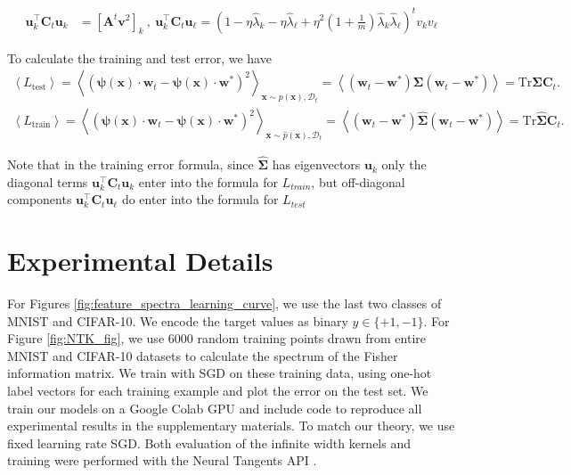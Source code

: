 \documentclass{article} %
\def\x{\bm x}
\def\w{\bm w}
\def\x{\mathbf x}
\def\w{\mathbf w}
\def\A{\mathbf A}
\def\u{\mathbf u}
\def\C{\mathbf C}
\begin{document}
\begin{align}
    \u_k^\top \C_{t} \u_k &= \left[ \A^t \bm v^2 \right]_k \ , \ \u_k^\top \C_{t} \u_\ell = \left(1-\eta\hat{\lambda}_k-\eta \hat{\lambda}_\ell + \eta^2 \left(1 + \frac{1}{m} \right)\hat{\lambda}_k \hat{\lambda}_\ell \right)^t v_k v_\ell
\end{align}

To calculate the training and test error, we have
\begin{align}
    \left< L_{\text{test}} \right>= \left< ( \bm\psi(\x) \cdot \w_t - \bm\psi(\x) \cdot \bm w^* )^2 \right>_{\x \sim p(\x), \mathcal D_t } = \left< (\w_t- \w^*) \bm\Sigma \left( \w_t - \w^* \right) \right> = \text{Tr} \bm\Sigma \C_t. \nonumber
    \\
    \left< L_{\text{train}} \right> = \left< ( \bm\psi(\x) \cdot \w_t - \bm\psi(\x) \cdot \bm w^* )^2 \right>_{\x \sim \hat{p}(\x), \mathcal D_t } = \left< (\w_t- \w^*) \bm{\hat\Sigma} \left( \w_t - \w^* \right) \right> = \text{Tr} \bm{\hat \Sigma} \C_t.
\end{align}

Note that in the training error formula, since $\bm{\hat \Sigma}$ has eigenvectors $\u_k$ only the diagonal terms $\u_k^\top \C_t \u_k$ enter into the formula for $L_{train}$, but off-diagonal components $\u_k^\top \C_t \u_{\ell}$ do enter into the formula for $L_{test}$


\section{Experimental Details}\label{expt_details}

For Figures \ref{fig:feature_spectra_learning_curve}, we use the last two classes of MNIST and CIFAR-10. We encode the target values as binary $y\in \{+1,-1\}$. For Figure \ref{fig:NTK_fig}, we use $6000$ random training points drawn from entire MNIST and CIFAR-10 datasets to calculate the spectrum of the Fisher information matrix. We train with SGD on these training data, using one-hot label vectors for each training example and plot the error on the test set. We train our models on a Google Colab GPU and include code to reproduce all experimental results in the supplementary materials. To match our theory, we use fixed learning rate SGD. Both evaluation of the infinite width kernels and training were performed with the Neural Tangents API \citep{neuraltangents2020}.
\end{document}
